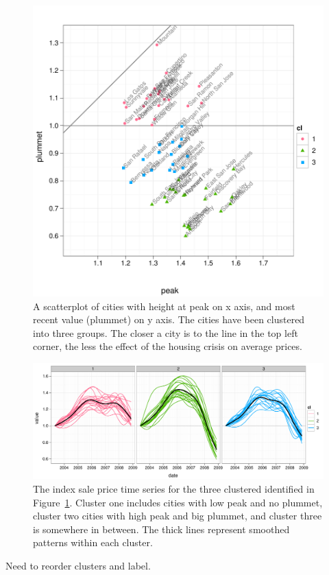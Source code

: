 \documentclass[oneside]{article}
\begin{document}
\begin{figure}[htbp]
  \centering
    \includegraphics[width=0.7 \linewidth]{cities-clustering}
  \caption{A scatterplot of cities with height at peak on x axis, and most recent value (plummet) on y axis.  The cities have been clustered into three groups.  The closer a city is to the line in the top left corner, the less the effect of the housing crisis on average prices.}
  \label{fig:clustering}
\end{figure}

\begin{figure}[htbp]
  \centering
  \includegraphics[width=\linewidth]{cities-indexed-clustered}
  \caption{The index sale price time series for the three clustered identified in Figure~\ref{fig:clustering}.  Cluster one includes cities with low peak and no plummet, cluster two cities with high peak and big plummet, and cluster three is somewhere in between.  The thick lines represent smoothed patterns within each cluster.}
  \label{fig:clustered}
\end{figure}

Need to reorder clusters and label.
\end{document}
